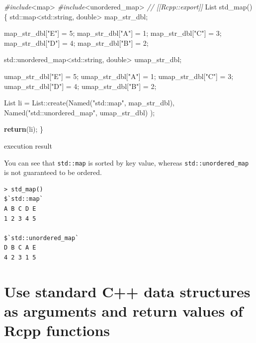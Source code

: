 \documentclass[
]{book}
\newenvironment{Shaded}{\begin{snugshade}}{\end{snugshade}}
\newcommand{\BuiltInTok}[1]{#1}
\newcommand{\CommentTok}[1]{\textcolor[rgb]{0.56,0.35,0.01}{\textit{#1}}}
\newcommand{\ControlFlowTok}[1]{\textcolor[rgb]{0.13,0.29,0.53}{\textbf{#1}}}
\newcommand{\DataTypeTok}[1]{\textcolor[rgb]{0.13,0.29,0.53}{#1}}
\newcommand{\DecValTok}[1]{\textcolor[rgb]{0.00,0.00,0.81}{#1}}
\newcommand{\ImportTok}[1]{#1}
\newcommand{\NormalTok}[1]{#1}
\newcommand{\PreprocessorTok}[1]{\textcolor[rgb]{0.56,0.35,0.01}{\textit{#1}}}
\newcommand{\StringTok}[1]{\textcolor[rgb]{0.31,0.60,0.02}{#1}}
\begin{document}
\begin{Shaded}
\begin{Highlighting}[]
\PreprocessorTok{#include}\ImportTok{<map>}
\PreprocessorTok{#include}\ImportTok{<unordered_map>}
\CommentTok{// [[Rcpp::export]]}
\NormalTok{List std_map()\{}
  \BuiltInTok{std::}\NormalTok{map<}\BuiltInTok{std::}\NormalTok{string, }\DataTypeTok{double}\NormalTok{> map_str_dbl;}
  
\NormalTok{  map_str_dbl[}\StringTok{"E"}\NormalTok{] = }\DecValTok{5}\NormalTok{;    }
\NormalTok{  map_str_dbl[}\StringTok{"A"}\NormalTok{] = }\DecValTok{1}\NormalTok{;}
\NormalTok{  map_str_dbl[}\StringTok{"C"}\NormalTok{] = }\DecValTok{3}\NormalTok{;    }
\NormalTok{  map_str_dbl[}\StringTok{"D"}\NormalTok{] = }\DecValTok{4}\NormalTok{;}
\NormalTok{  map_str_dbl[}\StringTok{"B"}\NormalTok{] = }\DecValTok{2}\NormalTok{;}
  
  \BuiltInTok{std::}\NormalTok{unordered_map<}\BuiltInTok{std::}\NormalTok{string, }\DataTypeTok{double}\NormalTok{> umap_str_dbl;}

\NormalTok{  umap_str_dbl[}\StringTok{"E"}\NormalTok{] = }\DecValTok{5}\NormalTok{;    }
\NormalTok{  umap_str_dbl[}\StringTok{"A"}\NormalTok{] = }\DecValTok{1}\NormalTok{;}
\NormalTok{  umap_str_dbl[}\StringTok{"C"}\NormalTok{] = }\DecValTok{3}\NormalTok{;    }
\NormalTok{  umap_str_dbl[}\StringTok{"D"}\NormalTok{] = }\DecValTok{4}\NormalTok{;}
\NormalTok{  umap_str_dbl[}\StringTok{"B"}\NormalTok{] = }\DecValTok{2}\NormalTok{;}
  
\NormalTok{  List li = List::create(Named(}\StringTok{"std::map"}\NormalTok{, map_str_dbl),}
\NormalTok{                         Named(}\StringTok{"std::unordered_map"}\NormalTok{, umap_str_dbl)}
\NormalTok{                        );}
  
  \ControlFlowTok{return}\NormalTok{(li);}
\NormalTok{\}}
\end{Highlighting}
\end{Shaded}

execution result

You can see that \texttt{std::map} is sorted by key value, whereas \texttt{std::unordered\_map} is not guaranteed to be ordered.

\begin{verbatim}
> std_map()
$`std::map`
A B C D E 
1 2 3 4 5 

$`std::unordered_map`
D B C A E 
4 2 3 1 5 
\end{verbatim}

\hypertarget{use-standard-c-data-structures-as-arguments-and-return-values-of-rcpp-functions}{%
\section{Use standard C++ data structures as arguments and return values of Rcpp functions}\label{use-standard-c-data-structures-as-arguments-and-return-values-of-rcpp-functions}}
\end{document}
